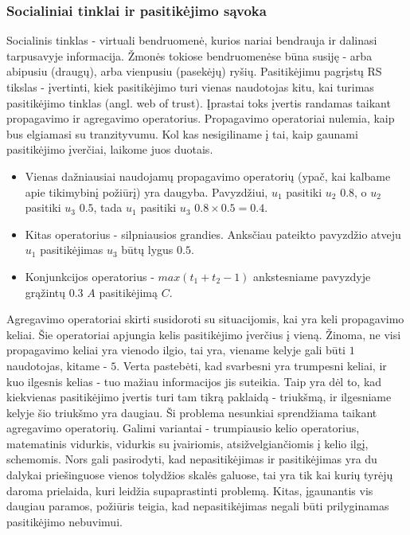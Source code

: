 \documentclass{VUMIFInfMagistrinis}
\begin{document}
\subsubsection{Socialiniai tinklai ir pasitikėjimo sąvoka}
Socialinis tinklas - virtuali bendruomenė, kurios nariai bendrauja ir dalinasi tarpusavyje informacija. Žmonės tokiose bendruomenėse būna susiję - arba abipusiu (draugų), arba vienpusiu (pasekėjų) ryšių.
Pasitikėjimu pagrįstų RS tikslas - įvertinti, kiek pasitikėjimo turi vienas naudotojas kitu, kai turimas pasitikėjimo tinklas (angl. web of trust). Įprastai toks įvertis randamas taikant propagavimo ir agregavimo operatorius. Propagavimo operatoriai nulemia, kaip bus elgiamasi su tranzityvumu. Kol kas nesigiliname į tai, kaip gaunami pasitikėjimo įverčiai, laikome juos duotais. 
\indent
\begin{itemize}
	\item Vienas dažniausiai naudojamų propagavimo operatorių (ypač, kai kalbame apie tikimybinį požiūrį) yra daugyba. Pavyzdžiui, $u_1$ pasitiki $u_2$ $0.8$, o $u_2$ pasitiki $u_3$ $0.5$, tada $u_1$ pasitiki $u_3$ $0.8 \times 0.5 = 0.4$. 
	\item Kitas operatorius - silpniausios grandies. Anksčiau pateikto pavyzdžio atveju $u_1$ pasitikėjimas $u_3$ būtų lygus $0.5$. 
	\item Konjunkcijos operatorius - $max(t_1+t_2-1)$ ankstesniame pavyzdyje grąžintų $0.3$ $A$ pasitikėjimą $C$.
\end{itemize}
Agregavimo operatoriai skirti susidoroti su situacijomis, kai yra keli propagavimo keliai. Šie operatoriai apjungia kelis pasitikėjimo įverčius į vieną. Žinoma, ne visi propagavimo keliai yra vienodo ilgio, tai yra, viename kelyje gali būti $1$ naudotojas, kitame - $5$. Verta pastebėti, kad svarbesni yra trumpesni keliai, ir kuo ilgesnis kelias - tuo mažiau informacijos jis suteikia. Taip yra dėl to, kad kiekvienas pasitikėjimo įvertis turi tam tikrą paklaidą - triukšmą, ir ilgesniame kelyje šio triukšmo yra daugiau. Ši problema nesunkiai sprendžiama taikant agregavimo operatorių. Galimi variantai - trumpiausio kelio operatorius, matematinis vidurkis, vidurkis su įvairiomis, atsižvelgiančiomis į kelio ilgį, schemomis.
\newline
\indent
Nors gali pasirodyti, kad nepasitikėjimas ir pasitikėjimas yra du dalykai priešinguose vienos tolydžios skalės galuose, tai yra tik kai kurių tyrėjų daroma prielaida, kuri leidžia supaprastinti problemą. Kitas, įgaunantis vis daugiau paramos, požiūris teigia, kad nepasitikėjimas negali būti prilyginamas pasitikėjimo nebuvimui.
\end{document}
